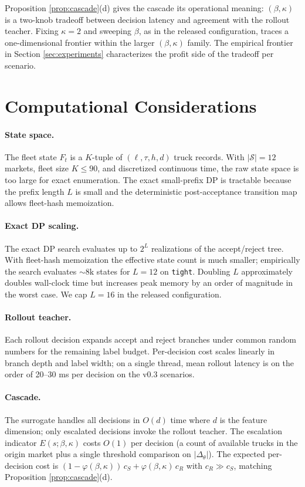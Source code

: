 \documentclass[11pt]{article}
\begin{document}
Proposition \ref{prop:cascade}(d) gives the cascade its operational
meaning: $(\beta, \kappa)$ is a two-knob tradeoff between decision
latency and agreement with the rollout teacher. Fixing $\kappa = 2$ and
sweeping $\beta$, as in the released configuration, traces a
one-dimensional frontier within the larger $(\beta, \kappa)$ family.
The empirical frontier in Section \ref{sec:experiments} characterizes
the profit side of the tradeoff per scenario.

\section{Computational Considerations}
\label{sec:complexity}

\paragraph{State space.}
The fleet state $F_t$ is a $K$-tuple of $(\ell, \tau, h, d)$ truck records.
With $|\mathcal{S}| = 12$ markets, fleet size $K \leq 90$, and discretized
continuous time, the raw state space is too large for exact enumeration.
The exact small-prefix DP is tractable because the prefix length $L$ is
small and the deterministic post-acceptance transition map allows
fleet-hash memoization.

\paragraph{Exact DP scaling.}
The exact DP search evaluates up to $2^L$ realizations of the accept/reject
tree. With fleet-hash memoization the effective state count is much
smaller; empirically the search evaluates $\sim 8\mathrm{k}$ states for
$L = 12$ on \texttt{tight}. Doubling $L$ approximately doubles wall-clock
time but increases peak memory by an order of magnitude in the worst case.
We cap $L = 16$ in the released configuration.

\paragraph{Rollout teacher.}
Each rollout decision expands accept and reject branches under common
random numbers for the remaining label budget. Per-decision cost scales
linearly in branch depth and label width; on a single thread, mean
rollout latency is on the order of 20--30 ms per decision on the v0.3
scenarios.

\paragraph{Cascade.}
The surrogate handles all decisions in $O(d)$ time where $d$ is the
feature dimension; only escalated decisions invoke the rollout teacher.
The escalation indicator $E(s; \beta, \kappa)$ costs $O(1)$ per decision
(a count of available trucks in the origin market plus a single
threshold comparison on $|\Delta_\theta|$). The expected per-decision
cost is $(1 - \varphi(\beta, \kappa))\, c_S + \varphi(\beta, \kappa)\, c_R$
with $c_R \gg c_S$, matching Proposition \ref{prop:cascade}(d).
\end{document}
